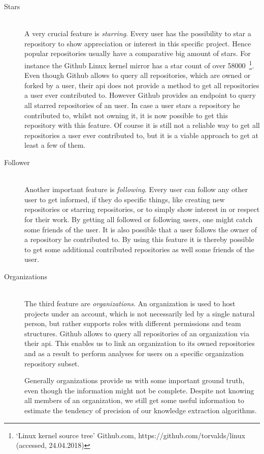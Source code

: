 \begin{description}
    \item[Stars] \hfill \\
        A very crucial feature is \emph{starring}. Every user has the possibility to star a repository to show appreciation or interest in this specific project.
        Hence popular repositories usually have a comparative big amount of stars. For instance the Github Linux kernel mirror has a star count of over 58000~\footnote{`Linux kernel source tree' Github.com, https://github.com/torvalds/linux (accessed, 24.04.2018)}.
        Even though Github allows to query all repositories, which are owned or forked by a user, their \ac{api} does not provide a method to get all repositories a user ever contributed to.
        However Github provides an endpoint to query all starred repositories of an user.
        In case a user stars a repository he contributed to, whilst not owning it, it is now possible to get this repository with this feature.
        Of course it is still not a reliable way to get all repositories a user ever contributed to, but it is a viable approach to get at least a few of them.

    \item[Follower] \hfill \\
        Another important feature is \emph{following}.
        Every user can follow any other user to get informed, if they do specific things, like creating new repositories or starring repositories, or to simply show interest in or respect for their work.
        By getting all followed or following users, one might catch some friends of the user.
        It is also possible that a user follows the owner of a repository he contributed to.
        By using this feature it is thereby possible to get some additional contributed repositories as well some friends of the user.

    \item[Organizations] \hfill \\
        The third feature are \emph{organizations}.
        An organization is used to host projects under an account, which is not necessarily led by a single natural person, but rather supports roles with different permissions and team structures.
        Github allows to query all repositories of an organization via their \ac{api}.
        This enables us to link an organization to its owned repositories and as a result to perform analyses for users on a specific organization repository subset.

        Generally organizations provide us with some important ground truth, even though the information might not be complete.
        Despite not knowing all members of an organization, we still get some useful information to estimate the tendency of precision of our knowledge extraction algorithms.
\end{description}
